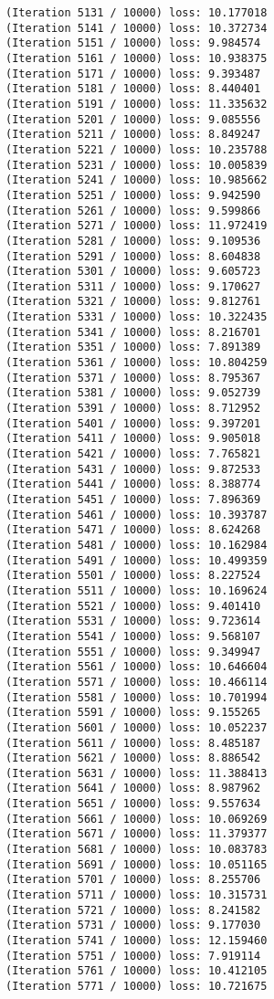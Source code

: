 \documentclass[11pt]{article}
\begin{document}
\begin{Verbatim}[commandchars=\\\{\}]
(Iteration 5131 / 10000) loss: 10.177018
(Iteration 5141 / 10000) loss: 10.372734
(Iteration 5151 / 10000) loss: 9.984574
(Iteration 5161 / 10000) loss: 10.938375
(Iteration 5171 / 10000) loss: 9.393487
(Iteration 5181 / 10000) loss: 8.440401
(Iteration 5191 / 10000) loss: 11.335632
(Iteration 5201 / 10000) loss: 9.085556
(Iteration 5211 / 10000) loss: 8.849247
(Iteration 5221 / 10000) loss: 10.235788
(Iteration 5231 / 10000) loss: 10.005839
(Iteration 5241 / 10000) loss: 10.985662
(Iteration 5251 / 10000) loss: 9.942590
(Iteration 5261 / 10000) loss: 9.599866
(Iteration 5271 / 10000) loss: 11.972419
(Iteration 5281 / 10000) loss: 9.109536
(Iteration 5291 / 10000) loss: 8.604838
(Iteration 5301 / 10000) loss: 9.605723
(Iteration 5311 / 10000) loss: 9.170627
(Iteration 5321 / 10000) loss: 9.812761
(Iteration 5331 / 10000) loss: 10.322435
(Iteration 5341 / 10000) loss: 8.216701
(Iteration 5351 / 10000) loss: 7.891389
(Iteration 5361 / 10000) loss: 10.804259
(Iteration 5371 / 10000) loss: 8.795367
(Iteration 5381 / 10000) loss: 9.052739
(Iteration 5391 / 10000) loss: 8.712952
(Iteration 5401 / 10000) loss: 9.397201
(Iteration 5411 / 10000) loss: 9.905018
(Iteration 5421 / 10000) loss: 7.765821
(Iteration 5431 / 10000) loss: 9.872533
(Iteration 5441 / 10000) loss: 8.388774
(Iteration 5451 / 10000) loss: 7.896369
(Iteration 5461 / 10000) loss: 10.393787
(Iteration 5471 / 10000) loss: 8.624268
(Iteration 5481 / 10000) loss: 10.162984
(Iteration 5491 / 10000) loss: 10.499359
(Iteration 5501 / 10000) loss: 8.227524
(Iteration 5511 / 10000) loss: 10.169624
(Iteration 5521 / 10000) loss: 9.401410
(Iteration 5531 / 10000) loss: 9.723614
(Iteration 5541 / 10000) loss: 9.568107
(Iteration 5551 / 10000) loss: 9.349947
(Iteration 5561 / 10000) loss: 10.646604
(Iteration 5571 / 10000) loss: 10.466114
(Iteration 5581 / 10000) loss: 10.701994
(Iteration 5591 / 10000) loss: 9.155265
(Iteration 5601 / 10000) loss: 10.052237
(Iteration 5611 / 10000) loss: 8.485187
(Iteration 5621 / 10000) loss: 8.886542
(Iteration 5631 / 10000) loss: 11.388413
(Iteration 5641 / 10000) loss: 8.987962
(Iteration 5651 / 10000) loss: 9.557634
(Iteration 5661 / 10000) loss: 10.069269
(Iteration 5671 / 10000) loss: 11.379377
(Iteration 5681 / 10000) loss: 10.083783
(Iteration 5691 / 10000) loss: 10.051165
(Iteration 5701 / 10000) loss: 8.255706
(Iteration 5711 / 10000) loss: 10.315731
(Iteration 5721 / 10000) loss: 8.241582
(Iteration 5731 / 10000) loss: 9.177030
(Iteration 5741 / 10000) loss: 12.159460
(Iteration 5751 / 10000) loss: 7.919114
(Iteration 5761 / 10000) loss: 10.412105
(Iteration 5771 / 10000) loss: 10.721675

\end{Verbatim}
\end{document}

